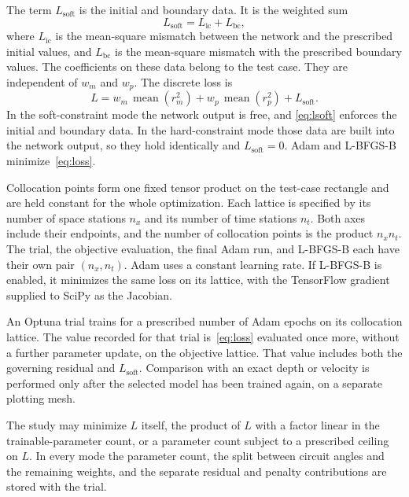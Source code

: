 \documentclass[11pt]{article}
\begin{document}
The term \(L_{\mathrm{soft}}\) is the initial and boundary data. It is the
weighted sum
\begin{equation}
\label{eq:lsoft}
L_{\mathrm{soft}} = L_{\mathrm{ic}} + L_{\mathrm{bc}},
\end{equation}
where \(L_{\mathrm{ic}}\) is the mean-square mismatch between the network
and the prescribed initial values, and \(L_{\mathrm{bc}}\) is the
mean-square mismatch with the prescribed boundary values. The coefficients
on these data belong to the test case. They are independent of \(w_{m}\)
and \(w_{p}\). The discrete loss is
\begin{equation}
\label{eq:loss}
L = w_{m}\,\operatorname{mean}(r_{m}^{2})
  + w_{p}\,\operatorname{mean}(r_{p}^{2})
  + L_{\mathrm{soft}}.
\end{equation}
In the soft-constraint mode the network output is free, and
\eqref{eq:lsoft} enforces the initial and boundary data. In the
hard-constraint mode those data are built into the network output, so
they hold identically and \(L_{\mathrm{soft}}=0\). Adam and L-BFGS-B
minimize~\eqref{eq:loss}.

Collocation points form one fixed tensor product on the test-case
rectangle and are held constant for the whole optimization. Each lattice
is specified by its number of space stations \(n_{x}\) and its number of
time stations \(n_{t}\). Both axes include their endpoints, and the
number of collocation points is the product \(n_{x}n_{t}\). The trial,
the objective evaluation, the final Adam run, and L-BFGS-B each have
their own pair \((n_{x},n_{t})\). Adam uses a constant learning rate.
If L-BFGS-B is enabled, it minimizes the same loss on its lattice, with
the TensorFlow gradient supplied to SciPy as the Jacobian.

An Optuna trial trains for a prescribed number of Adam epochs on its
collocation lattice. The value recorded for that trial is~\eqref{eq:loss}
evaluated once more, without a further parameter update, on the objective
lattice. That value includes both the governing residual and
\(L_{\mathrm{soft}}\). Comparison with an exact depth or velocity is
performed only after the selected model has been trained again, on a
separate plotting mesh.

The study may minimize \(L\) itself, the product of \(L\) with a factor
linear in the trainable-parameter count, or a parameter count subject to
a prescribed ceiling on \(L\). In every mode the parameter count, the
split between circuit angles and the remaining weights, and the separate
residual and penalty contributions are stored with the trial.
\end{document}
